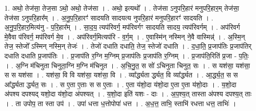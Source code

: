 \documentclass[17pt]{extarticle}
\begin{document}
1. अथो॒ तेज॑सा॒ तेज॒सा ऽथो॒ अथो॒ तेज॑सा । . अथो॒ इत्यथो᳚ । . तेज॑सा ऽनुपरि॒हार॑ मनुपरि॒हार॒म् तेज॑सा॒ तेज॑सा ऽनुपरि॒हार᳚म् । . अ॒नु॒प॒रि॒हारꣳ॑ सादयति सादयत्य नुपरि॒हार॑ मनुपरि॒हारꣳ॑ सादयति । . अ॒नु॒प॒रि॒हार॒मित्य॑नु - प॒रि॒हार᳚म् । . सा॒द॒य॒ त्यप॑रिवर्ग॒ मप॑रिवर्गꣳ सादयति सादय॒ त्यप॑रिवर्गम् । . अप॑रिवर्ग मे॒वैवा प॑रिवर्ग॒ मप॑रिवर्ग मे॒व । . अप॑रिवर्ग॒मित्यप॑रि - व॒र्ग॒म् । . ए॒वास्मि॑न् नस्मिन् ने॒वै वास्मिन्न्॑ । . अ॒स्मि॒न् तेज॒ स्तेजो᳚ ऽस्मिन् नस्मि॒न् तेजः॑ । . तेजो॑ दधाति दधाति॒ तेज॒ स्तेजो॑ दधाति । . द॒धा॒ति॒ प्र॒जाप॑तिः प्र॒जाप॑तिर् दधाति दधाति प्र॒जाप॑तिः । . प्र॒जाप॑ति र॒ग्नि म॒ग्निम् प्र॒जाप॑तिः प्र॒जाप॑ति र॒ग्निम् । . प्र॒जाप॑ति॒रिति॑ प्र॒जा - प॒तिः॒ । . अ॒ग्नि म॑चिनुता चिनुता॒ग्नि म॒ग्नि म॑चिनुत । . अ॒चि॒नु॒त॒ स सो॑ ऽचिनुता चिनुत॒ सः । . स यश॑सा॒ यश॑सा॒ स स यश॑सा । . यश॑सा॒ वि वि यश॑सा॒ यश॑सा॒ वि । . व्या᳚र्द्ध्यता र्द्ध्यत॒ वि व्या᳚र्द्ध्यत । . आ॒र्द्ध्य॒त॒ स स आ᳚र्द्ध्यता र्द्ध्यत॒ सः । . स ए॒ता ए॒ताः स स ए॒ताः । . ए॒ता य॑शो॒दा य॑शो॒दा ए॒ता ए॒ता य॑शो॒दाः । . य॒शो॒दा अ॑पश्य दपश्यद् यशो॒दा य॑शो॒दा अ॑पश्यत् । . य॒शो॒दा इति॑ यशः - दाः । . अ॒प॒श्य॒त् तास्ता अ॑पश्य दपश्य॒त् ताः । . ता उपोप॒ ता स्ता उप॑ । . उपा॑ धत्ता ध॒त्तोपोपा॑ धत्त । . अ॒ध॒त्त॒ ताभि॒ स्ताभि॑ रधत्ता धत्त॒ ताभिः॑ । \newline
\end{document}
